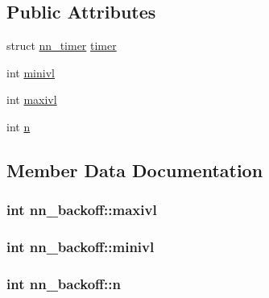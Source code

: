 \subsection*{Public Attributes}
\begin{DoxyCompactItemize}
\item 
struct \hyperlink{structnn__timer}{nn\+\_\+timer} \hyperlink{structnn__backoff_a95e67b73fd37ef3528d06f3c7567869e}{timer}
\item 
int \hyperlink{structnn__backoff_a0ea8ab220d58f392e2e601e903183f1b}{minivl}
\item 
int \hyperlink{structnn__backoff_a63bdf88c08ffc214c2187e76b3674061}{maxivl}
\item 
int \hyperlink{structnn__backoff_a92192ee8dd09ddaef649f064f7431860}{n}
\end{DoxyCompactItemize}


\subsection{Member Data Documentation}
\subsubsection[{maxivl}]{\setlength{\rightskip}{0pt plus 5cm}int nn\+\_\+backoff\+::maxivl}\hypertarget{structnn__backoff_a63bdf88c08ffc214c2187e76b3674061}{}\label{structnn__backoff_a63bdf88c08ffc214c2187e76b3674061}
\subsubsection[{minivl}]{\setlength{\rightskip}{0pt plus 5cm}int nn\+\_\+backoff\+::minivl}\hypertarget{structnn__backoff_a0ea8ab220d58f392e2e601e903183f1b}{}\label{structnn__backoff_a0ea8ab220d58f392e2e601e903183f1b}
\subsubsection[{n}]{\setlength{\rightskip}{0pt plus 5cm}int nn\+\_\+backoff\+::n}\hypertarget{structnn__backoff_a92192ee8dd09ddaef649f064f7431860}{}\label{structnn__backoff_a92192ee8dd09ddaef649f064f7431860}
